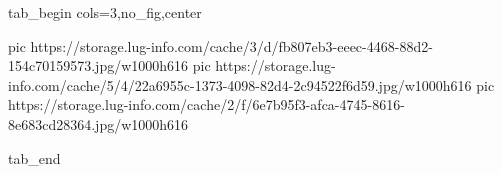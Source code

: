  
 
 
 
 

\ifcmt
  tab_begin cols=3,no_fig,center

     pic https://storage.lug-info.com/cache/3/d/fb807eb3-eeec-4468-88d2-154c70159573.jpg/w1000h616%
		 pic https://storage.lug-info.com/cache/5/4/22a6955c-1373-4098-82d4-2c94522f6d59.jpg/w1000h616%
		 pic https://storage.lug-info.com/cache/2/f/6e7b95f3-afca-4745-8616-8e683cd28364.jpg/w1000h616%

  tab_end
\fi
